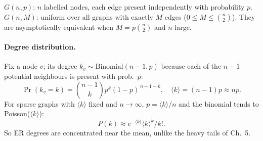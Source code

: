 \begin{definition}\label{def:er}
$G(n,p)$: $n$ labelled nodes, each edge present independently with probability $p$. $G(n,M)$: uniform over all graphs with exactly $M$ edges ($0\le M\le\binom{n}{2}$). They are asymptotically equivalent when $M=p\binom{n}{2}$ and $n$ large.
\end{definition}

\paragraph{Degree distribution.} Fix a node $v$; its degree $k_v\sim\text{Binomial}(n-1,p)$ because each of the $n-1$ potential neighbours is present with prob.\ $p$:
\begin{equation}
\Pr(k_v=k)=\binom{n-1}{k}p^k(1-p)^{\,n-1-k},\quad \langle k\rangle=(n-1)p\approx np.
\end{equation}
For sparse graphs with $\langle k\rangle$ fixed and $n\to\infty$, $p=\langle k\rangle/n$ and the binomial tends to Poisson($\langle k\rangle$):
\begin{equation}
P(k)\approx e^{-\langle k\rangle}\langle k\rangle^k/k!.
\end{equation}
So ER degrees are concentrated near the mean, unlike the heavy tails of Ch.~5.

